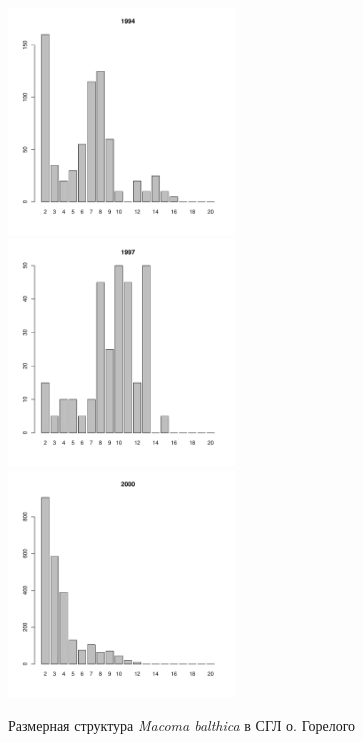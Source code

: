\documentclass[12pt, a4paper]{article}
\begin{document}
\begin{figure}[h]
\begin{multicols}{3}
\hfill
\includegraphics[width=60mm]{../White_Sea/Luvenga_Goreliy/middle2_1994_.pdf}
\hfill
\includegraphics[width=60mm]{../White_Sea/Luvenga_Goreliy/middle2_1997_.pdf}
\hfill
\includegraphics[width=60mm]{../White_Sea/Luvenga_Goreliy/middle2_2000_.pdf}
\end{multicols}



\caption{Размерная структура {\it Macoma balthica} в СГЛ о. Горелого}
\label{ris:size_str_Goreliy_mid}
\end{figure}
\end{document}
